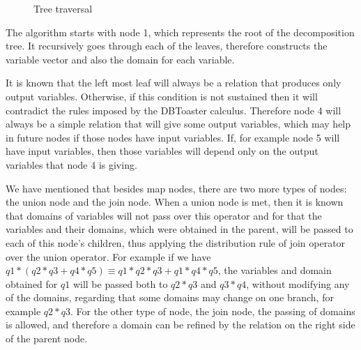\documentclass[12pt]{article}
\begin{document}
\begin{figure}[htbp]
\begin{center}
\end{center}
\caption{Tree traversal}
\label{fig1}
\end{figure}

	The algorithm starts with node 1, which represents the root of the decomposition tree. It recursively goes through each of the leaves, therefore constructs the variable vector and also the domain for each variable.
	
	It is known that the left most leaf will always be a relation that produces only output variables. Otherwise, if this condition is not sustained then it will contradict the rules imposed by the DBToaster calculus. Therefore node 4 will always be a simple relation that will give some output variables, which may help in future nodes if those nodes have input variables. If, for example node 5 will have input variables, then those variables will depend only on the output variables that node 4 is giving.
	
	We have mentioned that besides map nodes, there are two more types of nodes: the union node and the join node. When a union node is met, then it is known that domains of variables will not pass over this operator and for that the variables and their domains, which were obtained in the parent, will be passed to each of this node's children, thus applying the distribution rule of join operator over the union operator. For example if we have $ q1 * (q2 * q3 + q4 * q5) \equiv q1 * q2 * q3 + q1 * q4 * q5$, the variables and domain obtained for $q1$ will be passed both to $q2*q3$ and $q3*q4$, without modifying any of the domains, regarding that some domains may change on one branch, for example $q2*q3$. For the other type of node, the join node, the passing of domains is allowed, and therefore a domain can be refined by the relation on the right side of the parent node.
	
\end{document}
